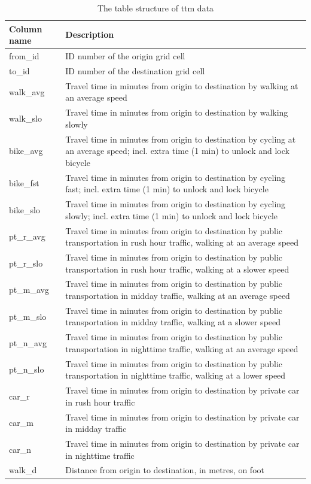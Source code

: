\begin{table}[H]
	\caption{The table structure of \acrshort{ttm} data \parencite{fin2023}}
	\label{tab:ttm table structure}
	\centering
	\begin{tabular}{ | L{0.15\textwidth} | L{0.75\textwidth} | }
		\hline
		Column name
		& Description
		\\
		\hline
		\hline
		from\_id
		& ID number of the origin grid cell
		\\
		\hline
		to\_id
		& ID number of the destination grid cell
		\\
		\hline
		walk\_avg
		& Travel time in minutes from origin to destination by walking at an average speed
		\\
		\hline
		walk\_slo
		& Travel time in minutes from origin to destination by walking slowly
		\\
		\hline
		bike\_avg
		& Travel time in minutes from origin to destination by cycling at an average speed; incl. extra time (1 min) to unlock and lock bicycle
		\\
		\hline
		bike\_fst
		& Travel time in minutes from origin to destination by cycling fast; incl. extra time (1 min) to unlock and lock bicycle
		\\
		\hline
		bike\_slo
		& Travel time in minutes from origin to destination by cycling slowly; incl. extra time (1 min) to unlock and lock bicycle
		\\
		\hline
		pt\_r\_avg
		& Travel time in minutes from origin to destination by public transportation in rush hour traffic, walking at an average speed
		\\
		\hline
		pt\_r\_slo
		& Travel time in minutes from origin to destination by public transportation in rush hour traffic, walking at a slower speed
		\\
		\hline
		pt\_m\_avg
		& Travel time in minutes from origin to destination by public transportation in midday traffic, walking at an average speed
		\\
		\hline
		pt\_m\_slo
		& Travel time in minutes from origin to destination by public transportation in midday traffic, walking at a slower speed
		\\
		\hline
		pt\_n\_avg
		& Travel time in minutes from origin to destination by public transportation in nighttime traffic, walking at an average speed
		\\
		\hline
		pt\_n\_slo
		& Travel time in minutes from origin to destination by public transportation in nighttime traffic, walking at a lower speed
		\\
		\hline
		car\_r
		& Travel time in minutes from origin to destination by private car in rush hour traffic
		\\
		\hline
		car\_m
		& Travel time in minutes from origin to destination by private car in midday traffic
		\\
		\hline
		car\_n
		& Travel time in minutes from origin to destination by private car in nighttime traffic
		\\
		\hline
		walk\_d
		& Distance from origin to destination, in metres, on foot
		\\
		\hline
	\end{tabular}
\end{table}

